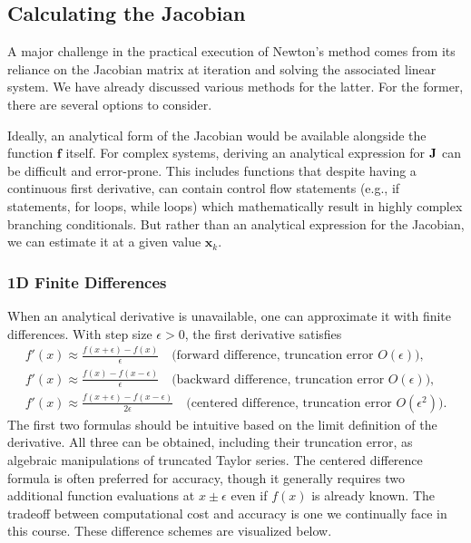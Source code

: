 \subsection{Calculating the Jacobian} 
A major challenge in the practical execution of Newton's method comes from its reliance on the Jacobian matrix at iteration and solving the associated linear system. We have already discussed various methods for the latter. For the former, there are several options to consider. 

Ideally, an analytical form of the Jacobian would be available alongside the function $\mathbf f$ itself. For complex systems, deriving an analytical expression for \(\mathbf{J}\) can be difficult and error-prone. This includes functions that despite having a continuous first derivative, can contain control flow statements (e.g., if statements, for loops, while loops) which mathematically result in highly complex branching conditionals. But rather than an analytical expression for the Jacobian, we can estimate it at a given value $\mathbf x_k$.  %

\subsubsection{1D Finite Differences} 
When an analytical derivative is unavailable, one can approximate it with finite differences. With step size \(\epsilon>0\), the first derivative satisfies
\begin{gather*}
  f'(x) \approx \frac{f(x+\epsilon)-f(x)}{\epsilon}
  \quad\text{(forward difference, truncation error }O(\epsilon)\text{),} \\
  f'(x) \approx \frac{f(x)-f(x-\epsilon)}{\epsilon}
  \quad\text{(backward difference, truncation error }O(\epsilon)\text{),} \\
  f'(x) \approx \frac{f(x+\epsilon)-f(x-\epsilon)}{2\epsilon}
  \quad\text{(centered difference, truncation error }O(\epsilon^2)\text{).}
\end{gather*}
The first two formulas should be intuitive based on the limit definition of the derivative. All three can be obtained, including their truncation error, as algebraic manipulations of truncated Taylor series. The centered difference formula is often preferred for accuracy, though it generally requires two additional function evaluations at \(x\pm\epsilon\) even if \(f(x)\) is already known. The tradeoff between computational cost and accuracy is one we continually face in this course. These difference schemes are visualized below. 

